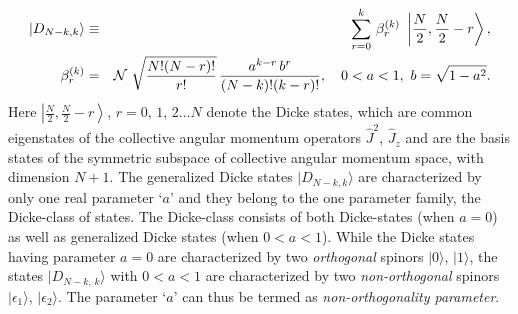 \documentclass[pra,a4paper,showpacs,superscriptaddress]{revtex4}
\begin{document}
\begin{eqnarray}
\label{nono}
\vert D_{N-k, k}\rangle &\equiv & \sum_{r=0}^k\, \beta^{(k)}_{r}\,\,  \left\vert\frac{N}{2},\frac{N}{2}-r \right\rangle,  \\ 
\beta^{(k)}_{r}&=&{\cal N}\,\, 
\sqrt{\frac{N!(N-r)!}{r!}}\,\frac{a^{k-r}\, b^r}{(N-k)! (k-r)!}, \ \ \ 0<a<1,  \ b=\sqrt{1-a^2}. \nonumber 
 \end{eqnarray}
Here $\left\vert\frac{N}{2},\frac{N}{2}-r \right\rangle$, $r=0,\,1,\,2\ldots N$ denote the Dicke states, which are common eigenstates of the collective angular momentum operators $\hat{J}^2$, $\hat{J}_z$ and are the basis states of the symmetric subspace of collective angular momentum space,  with dimension $N+1$. 
The generalized Dicke states $\vert D_{N-k, k}\rangle$ are characterized by only one real parameter `$a$' and they belong to the one parameter family, the Dicke-class of states. 
The Dicke-class consists of both Dicke-states (when $a=0$) as well as generalized Dicke states (when $0<a<1$). While the Dicke states having parameter $a=0$ are characterized by two {\emph {orthogonal}} spinors $\vert 0\rangle$, $\vert 1\rangle$, the states $\vert D_{N-k,\, k}\rangle$ with $0<a<1$ are characterized by two {\emph {non-orthogonal}} spinors $\vert \epsilon_1\rangle$, $\vert \epsilon_2\rangle$. The parameter `$a$' can thus be termed as {\emph{non-orthogonality parameter}}.  
\end{document}
